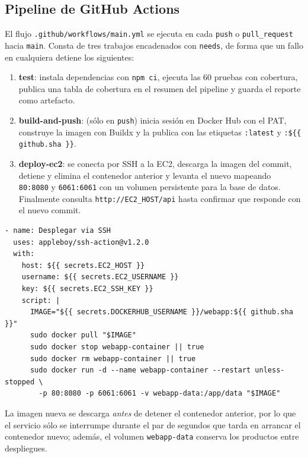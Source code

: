 \documentclass[12pt,letterpaper]{article}
\begin{document}
\subsection{Pipeline de GitHub Actions}

El flujo \texttt{.github/workflows/main.yml} se ejecuta en cada \texttt{push} o \texttt{pull\_request} hacia \texttt{main}. Consta de tres trabajos encadenados con \texttt{needs}, de forma que un fallo en cualquiera detiene los siguientes:

\begin{enumerate}
  \item \textbf{test}: instala dependencias con \texttt{npm ci}, ejecuta las 60 pruebas con cobertura, publica una tabla de cobertura en el resumen del pipeline y guarda el reporte como artefacto.
  \item \textbf{build-and-push}: (sólo en \texttt{push}) inicia sesión en Docker Hub con el PAT, construye la imagen con Buildx y la publica con las etiquetas \texttt{:latest} y \texttt{:\$\{\{ github.sha \}\}}.
  \item \textbf{deploy-ec2}: se conecta por SSH a la EC2, descarga la imagen del commit, detiene y elimina el contenedor anterior y levanta el nuevo mapeando \texttt{80:8080} y \texttt{6061:6061} con un volumen persistente para la base de datos. Finalmente consulta \texttt{http://EC2\_HOST/api} hasta confirmar que responde con el nuevo commit.
\end{enumerate}

\begin{lstlisting}[caption={Paso de despliegue del workflow.}]
- name: Desplegar via SSH
  uses: appleboy/ssh-action@v1.2.0
  with:
    host: ${{ secrets.EC2_HOST }}
    username: ${{ secrets.EC2_USERNAME }}
    key: ${{ secrets.EC2_SSH_KEY }}
    script: |
      IMAGE="${{ secrets.DOCKERHUB_USERNAME }}/webapp:${{ github.sha }}"
      sudo docker pull "$IMAGE"
      sudo docker stop webapp-container || true
      sudo docker rm webapp-container || true
      sudo docker run -d --name webapp-container --restart unless-stopped \
        -p 80:8080 -p 6061:6061 -v webapp-data:/app/data "$IMAGE"
\end{lstlisting}

La imagen nueva se descarga \emph{antes} de detener el contenedor anterior, por lo que el servicio sólo se interrumpe durante el par de segundos que tarda en arrancar el contenedor nuevo; además, el volumen \texttt{webapp-data} conserva los productos entre despliegues.
\end{document}
